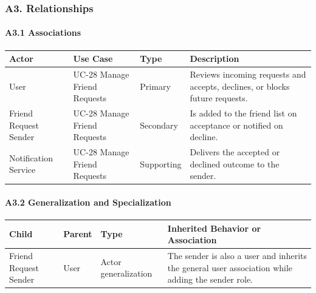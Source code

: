 \documentclass[12pt]{article}
\renewcommand{\baselinestretch}{1.5}
\begin{document}
\hypertarget{sec:a3-relationships}{}
\subsubsection*{A3. Relationships}
\par\medskip

\hypertarget{sec:a3-1-associations}{}
\paragraph*{A3.1 Associations}
\par\medskip

\begingroup
\small
\renewcommand{\baselinestretch}{1.0}\selectfont
\renewcommand{\arraystretch}{1.15}
\setlength{\tabcolsep}{6pt}
\begin{longtable}{|>{\raggedright\arraybackslash}p{}|>{\raggedright\arraybackslash}p{}|>{\raggedright\arraybackslash}p{}|>{\raggedright\arraybackslash}p{}|}
\hline
\textbf{Actor} & \textbf{Use Case} & \textbf{Type} & \textbf{Description} \\ \hline
\endhead
User & UC-28 Manage Friend Requests & Primary & Reviews incoming requests and accepts, declines, or blocks future requests. \\ \hline
Friend Request Sender & UC-28 Manage Friend Requests & Secondary & Is added to the friend list on acceptance or notified on decline. \\ \hline
Notification Service & UC-28 Manage Friend Requests & Supporting & Delivers the accepted or declined outcome to the sender. \\ \hline
\end{longtable}
\endgroup
\par\medskip

\hypertarget{sec:a3-2-generalization-and-specialization}{}
\paragraph*{A3.2 Generalization and Specialization}
\par\medskip

\begingroup
\small
\renewcommand{\baselinestretch}{1.0}\selectfont
\renewcommand{\arraystretch}{1.15}
\setlength{\tabcolsep}{6pt}
\begin{longtable}{|>{\raggedright\arraybackslash}p{}|>{\raggedright\arraybackslash}p{}|>{\raggedright\arraybackslash}p{}|>{\raggedright\arraybackslash}p{}|}
\hline
\textbf{Child} & \textbf{Parent} & \textbf{Type} & \textbf{Inherited Behavior or Association} \\ \hline
\endhead
Friend Request Sender & User & Actor generalization & The sender is also a user and inherits the general user association while adding the sender role. \\ \hline
\end{longtable}
\endgroup
\par\medskip
\end{document}
